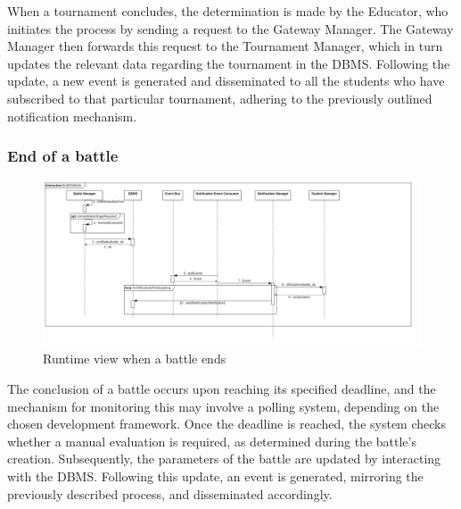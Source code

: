 When a tournament concludes, the determination is made by the Educator, who initiates the process by sending a request to the Gateway Manager. The Gateway Manager then forwards this request to the Tournament Manager, which in turn updates the relevant data regarding the tournament in the DBMS. Following the update, a new event is generated and disseminated to all the students who have subscribed to that particular tournament, adhering to the previously outlined notification mechanism.

\newpage

\subsubsection*{End of a battle}
\begin{figure}[h!]
    \centering
    \includegraphics[width=1.3\linewidth, angle=90]{2.ArchitecturalDesign/res/EndOfABattle.jpg}
    \caption{Runtime view when a battle ends}
    \label{fig:battle_end}
\end{figure}

The conclusion of a battle occurs upon reaching its specified deadline, and the mechanism for monitoring this may involve a polling system, depending on the chosen development framework. Once the deadline is reached, the system checks whether a manual evaluation is required, as determined during the battle's creation. Subsequently, the parameters of the battle are updated by interacting with the DBMS. Following this update, an event is generated, mirroring the previously described process, and disseminated accordingly.

\newpage
